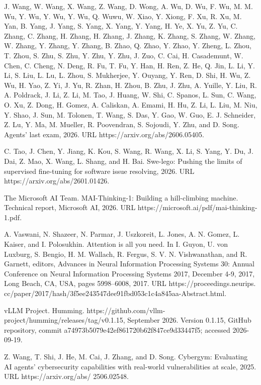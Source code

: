 \documentclass[
  10
]{article}
\begin{document}
J. Wang, W. Wang, X. Wang, Z. Wang, D. Wong, A. Wu, D. Wu, F. Wu, M. M.
Wu, Y. Wu, Y. Wu, Y. Wu, Q. Wuwu, W. Xiao, Y. Xiong, F. Xu, R. Xu, M.
Yan, B. Yang, J. Yang, S. Yang, X. Yang, Y. Yang, H. Ye, X. Yu, Z. Yu,
C. Zhang, C. Zhang, H. Zhang, H. Zhang, J. Zhang, K. Zhang, S. Zhang, W.
Zhang, W. Zhang, Y. Zhang, Y. Zhang, B. Zhao, Q. Zhao, Y. Zhao, Y.
Zheng, L. Zhou, T. Zhou, S. Zhu, S. Zhu, Y. Zhu, Y. Zhu, J. Zuo, C. Cai,
H. Casademunt, W. Chen, C. Cheng, N. Deng, R. Fu, T. Fu, Y. Han, H. Ren,
Z. He, Q. Jin, L. Li, Y. Li, S. Liu, L. Lu, L. Zhou, S. Mukherjee, Y.
Ouyang, Y. Ren, D. Shi, H. Wu, Z. Wu, H. Yao, Z. Yi, J. Yu, R. Zhan, H.
Zhou, B. Zhu, J. Zhu, A. Yuille, Y. Liu, R. A. Poldrack, J. Li, Z. Li,
M. Tao, J. Huang, W. Shi, C. Spanos, L. Sun, C. Wang, O. Xu, Z. Dong, H.
Gomez, A. Caliskan, A. Emami, H. Hu, Z. Li, L. Liu, M. Niu, Y. Shao, J.
Sun, M. Tolonen, T. Wang, S. Das, Y. Gao, W. Guo, E. J. Schneider, Z.
Lu, Y. Ma, M. Mueller, R. Poovendran, S. Sojoudi, Y. Zhu, and D. Song.
Agents' last exam, 2026. URL https://arxiv.org/abs/2606.05405.

C. Tao, J. Chen, Y. Jiang, K. Kou, S. Wang, R. Wang, X. Li, S. Yang, Y.
Du, J. Dai, Z. Mao, X. Wang, L. Shang, and H. Bai. Swe-lego: Pushing the
limits of supervised fine-tuning for software issue resolving, 2026. URL
https://arxiv.org/abs/2601.01426.

The Microsoft AI Team. MAI-Thinking-1: Building a hill-climbing machine.
Technical report, Microsoft AI, 2026. URL
https://microsoft.ai/pdf/mai-thinking-1.pdf.

A. Vaswani, N. Shazeer, N. Parmar, J. Uszkoreit, L. Jones, A. N. Gomez,
L. Kaiser, and I. Polosukhin. Attention is all you need. In I. Guyon, U.
von Luxburg, S. Bengio, H. M. Wallach, R. Fergus, S. V. N. Vishwanathan,
and R. Garnett, editors, Advances in Neural Information Processing
Systems 30: Annual Conference on Neural Information Processing Systems
2017, December 4-9, 2017, Long Beach, CA, USA, pages 5998--6008, 2017.
URL https://proceedings.neurips.
cc/paper/2017/hash/3f5ee243547dee91fbd053c1c4a845aa-Abstract.html.

vLLM Project. Humming. https://github.com/vllm-project/humming/releases/tag/v0.1.15,
September 2026. Version 0.1.15, GitHub repository, commit
a74973b5079e42ef861720b62f847ce9d33447f5; accessed 2026-09-19.

Z. Wang, T. Shi, J. He, M. Cai, J. Zhang, and D. Song. Cybergym:
Evaluating AI agents' cybersecurity capabilities with real-world
vulnerabilities at scale, 2025. URL https://arxiv.org/abs/ 2506.02548.
\end{document}
